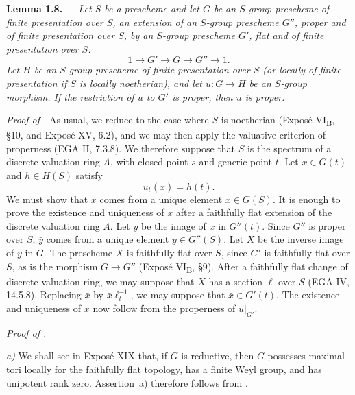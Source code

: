 \medskip
\noindent{}%
\textbf{Lemma 1.8.} --- \textit{Let \(S\) be a prescheme and let
\(G\) be an \(S\)-group prescheme of finite presentation over \(S\),
an extension of an \(S\)-group prescheme \(G''\), proper and of finite
presentation over \(S\), by an \(S\)-group prescheme \(G'\), flat and
of finite presentation over \(S\):}
\[
  1\longrightarrow G'\longrightarrow G\longrightarrow G''
  \longrightarrow 1.
\]
\textit{Let \(H\) be an \(S\)-group prescheme of finite presentation
over \(S\) (or locally of finite presentation if \(S\) is locally
noetherian), and let \(u:G\to H\) be an \(S\)-group morphism. If the
restriction of \(u\) to \(G'\) is proper, then \(u\) is proper.}

\smallskip
\noindent\textit{Proof of .}
As usual, we reduce to the case where \(S\) is noetherian (Exposé
VI\textsubscript{B}, \S10, and Exposé XV, 6.2), and we may then apply
the valuative criterion of properness (EGA II, 7.3.8). We therefore
suppose that \(S\) is the spectrum of a discrete valuation ring
\(A\), with closed point \(s\) and generic point \(t\). Let
\(\bar x\in G(t)\) and \(h\in H(S)\) satisfy
\[
  u_t(\bar x)=h(t).
\]
We must show that \(\bar x\) comes from a unique element
\(x\in G(S)\). It is enough to prove the existence and uniqueness of
\(x\) after a faithfully flat extension of the discrete valuation
ring \(A\). Let \(\bar y\) be the image of \(\bar x\) in \(G''(t)\).
Since \(G''\) is proper over \(S\), \(\bar y\) comes from a unique
element \(y\in G''(S)\). Let \(X\) be the inverse image of \(y\) in
\(G\). The prescheme \(X\) is faithfully flat over \(S\), since
\(G'\) is faithfully flat over \(S\), as is the morphism
\(G\to G''\) (Exposé VI\textsubscript{B}, \S9). After a faithfully
flat change of discrete valuation ring, we may suppose that \(X\)
has a section \(\ell\) over \(S\) (EGA IV, 14.5.8). Replacing
\(\bar x\) by \(\bar x\ell_t^{-1}\), we may suppose that
\(\bar x\in G'(t)\). The existence and uniqueness of \(x\) now
follow from the properness of \(u|_{G'}\).

\medskip
\noindent\textit{Proof of .}

\smallskip
\noindent\textit{a)}
We shall see in Exposé XIX that, if \(G\) is reductive, then \(G\)
possesses maximal tori locally for the faithfully flat topology, has
a finite Weyl group, and has unipotent rank zero. Assertion~a)
therefore follows from .

